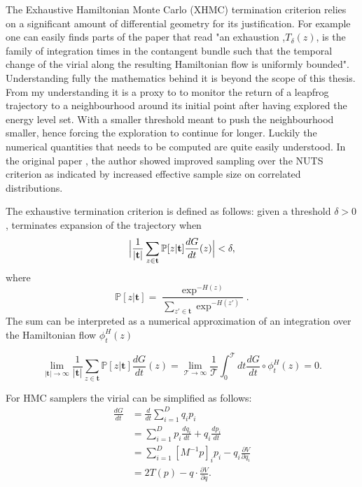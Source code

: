 \documentclass[12pt]{report}
\begin{document}
The Exhaustive Hamiltonian Monte Carlo (XHMC) termination criterion  relies on a significant amount of differential geometry for its justification. For example one can easily finds parts of the paper that read "an exhaustion ,$T_{\delta}(z)$, is the family of integration times in the contangent bundle such that the temporal change of the virial along the resulting Hamiltonian flow is uniformly bounded". Understanding fully the mathematics behind it is beyond the scope of this thesis. From my understanding it is a proxy to to monitor the return of a leapfrog trajectory to a neighbourhood around its initial point after having explored the energy level set. With a smaller threshold meant to push the neighbourhood smaller, hence forcing the exploration to continue for longer. Luckily the numerical quantities that needs to be computed are quite easily understood. In the original paper \cite{betancourt2016identifying}, the author showed improved sampling over the NUTS criterion as indicated by increased effective sample size on correlated distributions. 

The exhaustive termination criterion is defined as follows: given a threshold $\delta > 0$, terminates expansion of the trajectory when 
\[  \Bigl |\frac{1}{|\mathbf{t}|} \sum_{z \in \mathbf{t}} \mathbb{P}[z | \mathbf{t}] \frac{dG}{dt}(z) \Bigr | < \delta, \]
where 
\[ \mathbb{P}[z| \mathbf{t}] = \frac{\exp^{-H(z)}}{\sum_{z' \in \mathbf{t}} \exp^{-H(z')}}. \]
The sum can be interpreted as a numerical approximation of an integration over the Hamiltonian flow $\phi_{t}^H(z)$

\[ \lim_{|\mathbf{t}| \rightarrow \infty} \frac{1}{|\mathbf{t}|} \sum_{z \in \mathbf{t}} \mathbb{P}[z | \mathbf{t}] \frac{dG}{dt}(z)  = \lim_{\mathcal{T} \rightarrow \infty} \frac{1}{\mathcal{T}} \int_0^\mathcal{T} dt \frac{dG}{dt} \circ \phi_{t}^H(z) = 0. \]

For HMC samplers the virial can be simplified as follows:
\begin{align*}
 \frac{dG}{dt} &= \frac{d}{dt}\sum_{i=1}^D q_i p_i \\
 &= \sum_{i=1}^D p_i \frac{dq_i}{dt} + q_i \frac{dp_i}{dt} \\
 &= \sum_{i=1}^D [M^{-1}p]_i p_i - q_i \frac{\partial V}{\partial q_i} \\
 &= 2 T(p) - q \cdot \frac{\partial V}{\partial q}.\\
\end{align*}
\end{document}
